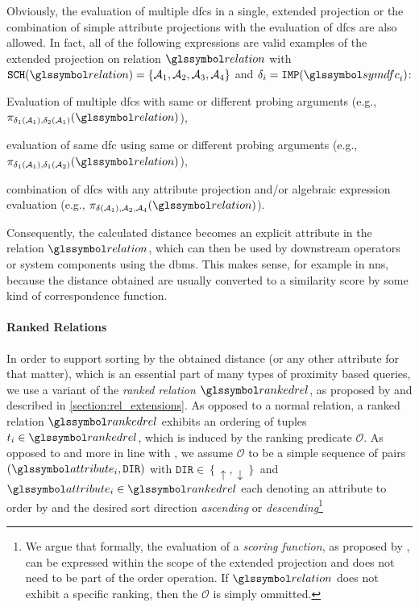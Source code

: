 Obviously, the evaluation of multiple \acrshort{dfc}s in a single, extended projection or the combination of simple attribute projections with the evaluation of \acrshort{dfc}s are also allowed. In fact, all of the following expressions are valid examples of the extended projection on relation $\relation$ with $\mathtt{SCH}(\relation) = \{ \mathcal{A}_1, \mathcal{A}_2, \mathcal{A}_3, \mathcal{A}_4 \}$ and $\delta_i = \mathtt{IMP}(\symdfc_i)$: 
\begin{enumerate*}[label=(\roman*)]
    \item Evaluation of multiple \acrshort{dfc}s with same or different probing arguments (e.g., $\pi_{\delta_1(\mathcal{A}_1), \delta_2(\mathcal{A}_1)}(\relation)$), 
    \item evaluation of same \acrshort{dfc} using same or different probing arguments (e.g., $\pi_{\delta_1(\mathcal{A}_1), \delta_1(\mathcal{A}_2)}(\relation)$),
    \item combination of \acrshort{dfc}s with any attribute projection and/or algebraic expression evaluation (e.g., $\pi_{\delta(\mathcal{A}_1), \mathcal{A}_2, \mathcal{A}_4}(\relation)$).
\end{enumerate*}

Consequently, the calculated distance becomes an explicit attribute in the relation $\relation$, which can then be used by downstream operators or system components using the \acrshort{dbms}. This makes sense, for example in \acrshort{nns}, because the distance obtained are usually converted to a similarity score by some kind of correspondence function.

\paragraph{Ranked Relations}

In order to support sorting by the obtained distance (or any other attribute for that matter), which is an essential part of many types of proximity based queries, we use a variant of the \emph{ranked relation} $\rankedrel$, as proposed by \cite{Chengkai:2005RankSQL} and described in \cref{section:rel_extensions}. As opposed to a normal relation, a ranked relation $\rankedrel$ exhibits an ordering of tuples $t_i \in \rankedrel$, which is induced by the ranking predicate $\mathcal{O}$. As opposed to \cite{Chengkai:2005RankSQL} and more in line with \cite{Garcia:2009Database}, we assume $\mathcal{O}$ to be a simple sequence of pairs $(\attribute_i, \mathtt{DIR})$ with $\mathtt{DIR} \in \left\{ \uparrow, \downarrow \right\}$ and $\attribute_i \in \rankedrel$ each denoting an attribute to order by and the desired sort direction \emph{ascending} or \emph{descending}\footnote{We argue that formally, the evaluation of a \emph{scoring function}, as proposed by \cite{Chengkai:2005RankSQL}, can be expressed within the scope of the extended projection and does not need to be part of the order operation. If $\relation$ does not exhibit a specific ranking, then the $\mathcal{O}$ is simply ommitted.}

